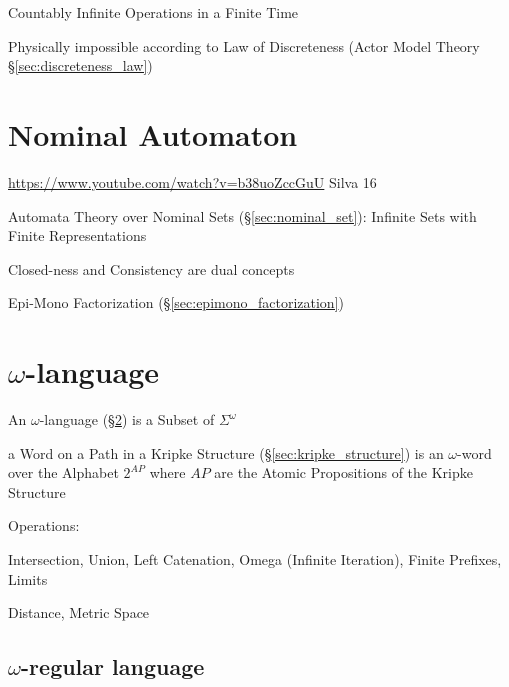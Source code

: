 Countably Infinite Operations in a Finite Time

\fist Physically impossible according to Law of Discreteness (Actor
Model Theory \S\ref{sec:discreteness_law})



\section{Nominal Automaton}\label{sec:nominal_automaton}

\url{https://www.youtube.com/watch?v=b38uoZccGuU} Silva 16

Automata Theory over Nominal Sets (\S\ref{sec:nominal_set}): Infinite
Sets with Finite Representations

Closed-ness and Consistency are dual concepts

Epi-Mono Factorization (\S\ref{sec:epimono_factorization})



\section{$\omega$-language}\label{sec:omega_language}

An $\omega$-language (\S\ref{sec:omega_language}) is a Subset of
$\Sigma^\omega$

a Word on a Path in a Kripke Structure (\S\ref{sec:kripke_structure})
is an $\omega$-word over the Alphabet $2^{AP}$ where $AP$ are the
Atomic Propositions of the Kripke Structure

Operations:

Intersection, Union, Left Catenation, Omega (Infinite Iteration),
Finite Prefixes, Limits

Distance, Metric Space %



\subsection{$\omega$-regular language}\label{sec:omega_regular}

